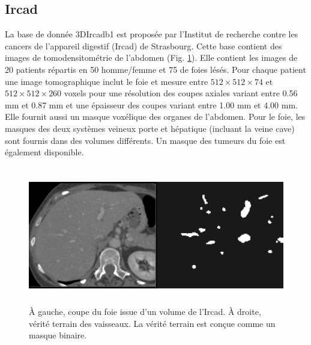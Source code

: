 
\subsection{Ircad}
La base de donnée 3DIrcadb1 est proposée par l'Institut de recherche contre les cancers de l'appareil digestif (Ircad) de Strasbourg. Cette base contient des images de tomodensitométrie de l'abdomen (Fig. \ref{fig:Ircad_examples}). Elle contient les images de 20 patients répartis en 50 \percent{}homme/femme et 75 \percent{}de foies lésés. Pour chaque patient une image tomographique inclut le foie et mesure entre $512 \times 512 \times 74$ et $512 \times 512 \times 260$ voxels pour une résolution des coupes axiales variant entre 0.56 mm et 0.87 mm et une épaisseur des coupes variant entre 1.00 mm et 4.00 mm. Elle fournit aussi un masque voxélique des organes de l'abdomen. Pour le foie, les masques des deux systèmes veineux porte et hépatique (incluant la veine cave) sont fournis dans des volumes différents. Un masque des tumeurs du foie est également disponible.
\begin{figure}
    \centering
    \includegraphics[height=6cm]{Images/Ircad_examples.png}
    \caption{À gauche, coupe du foie issue d'un volume de l'Ircad. À droite, vérité terrain des vaisseaux. La vérité terrain est conçue comme un masque binaire.}
    \label{fig:Ircad_examples}
\end{figure}

